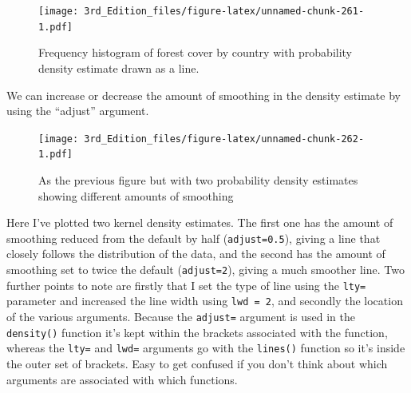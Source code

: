 \documentclass[
]{book}
\newenvironment{Shaded}{\begin{snugshade}}{\end{snugshade}}
\newcommand{\CommentTok}[1]{\textcolor[rgb]{0.56,0.35,0.01}{\textit{#1}}}
\newcommand{\DataTypeTok}[1]{\textcolor[rgb]{0.13,0.29,0.53}{#1}}
\newcommand{\DecValTok}[1]{\textcolor[rgb]{0.00,0.00,0.81}{#1}}
\newcommand{\FloatTok}[1]{\textcolor[rgb]{0.00,0.00,0.81}{#1}}
\newcommand{\KeywordTok}[1]{\textcolor[rgb]{0.13,0.29,0.53}{\textbf{#1}}}
\newcommand{\NormalTok}[1]{#1}
\newcommand{\OperatorTok}[1]{\textcolor[rgb]{0.81,0.36,0.00}{\textbf{#1}}}
\newcommand{\OtherTok}[1]{\textcolor[rgb]{0.56,0.35,0.01}{#1}}
\newcommand{\StringTok}[1]{\textcolor[rgb]{0.31,0.60,0.02}{#1}}
\begin{document}
\begin{figure}
\centering
\texttt{[image: 3rd\_Edition\_files/figure-latex/unnamed-chunk-261-1.pdf]}
\caption{\label{fig:unnamed-chunk-261}Frequency histogram of forest cover by country with probability density estimate drawn as a line.}
\end{figure}

We can increase or decrease the amount of smoothing in the density estimate by using the ``adjust'' argument.

\begin{Shaded}
\end{Shaded}

\begin{figure}
\centering
\texttt{[image: 3rd\_Edition\_files/figure-latex/unnamed-chunk-262-1.pdf]}
\caption{\label{fig:unnamed-chunk-262}As the previous figure but with two probability density estimates showing different amounts of smoothing}
\end{figure}

Here I've plotted two kernel density estimates. The first one has the amount of smoothing reduced from the default by half (\texttt{adjust=0.5}), giving a line that closely follows the distribution of the data, and the second has the amount of smoothing set to twice the default (\texttt{adjust=2}), giving a much smoother line. Two further points to note are firstly that I set the type of line using the \texttt{lty=} parameter and increased the line width using \texttt{lwd\ =\ 2}, and secondly the location of the various arguments. Because the \texttt{adjust=} argument is used in the \texttt{density()} function it's kept within the brackets associated with the function, whereas the \texttt{lty=} and \texttt{lwd=} arguments go with the \texttt{lines()} function so it's inside the outer set of brackets. Easy to get confused if you don't think about which arguments are associated with which functions.
\end{document}
